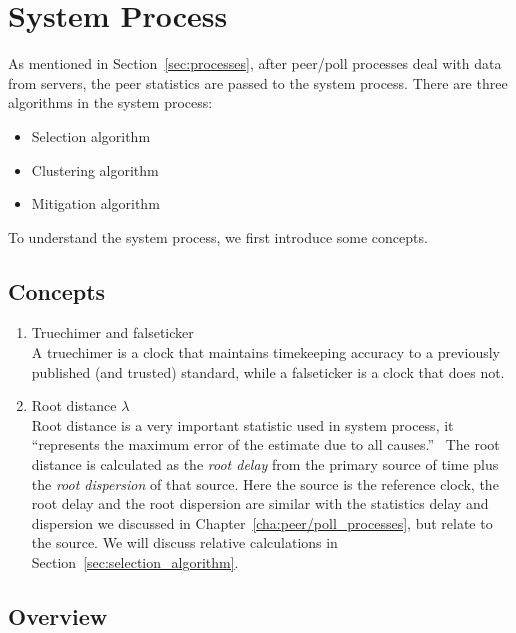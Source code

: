 

\chapter{System Process}
\label{cha:system_process}

As mentioned in Section~\ref{sec:processes}, after peer/poll processes deal
with data from servers, the peer statistics are passed to the system process.
There are three algorithms in the system process:
\begin{itemize}
    \item Selection algorithm
    \item Clustering algorithm
    \item Mitigation algorithm
\end{itemize}

To understand the system process, we first introduce some concepts.

\section{Concepts}%
\label{sec:system_concepts}
\begin{enumerate}
    \item Truechimer and falseticker\\
        A truechimer is a clock that maintains timekeeping accuracy to a
        previously published (and trusted) standard, while a falseticker is a
        clock that does not.
    \item Root distance $\lambda$\\
        Root distance is a very important statistic used in system process, it
        ``represents the maximum error of the estimate due to all
        causes.''~\cite{performance_metrics} The root distance is calculated as
        the \emph{root delay} from the primary source of time plus the
        \emph{root dispersion} of that source. Here the source is the reference
        clock, the root delay and the root dispersion are similar with the
        statistics delay and dispersion we discussed in
        Chapter~\ref{cha:peer/poll_processes}, but relate to the source. We
        will discuss relative calculations in
        Section~\ref{sec:selection_algorithm}.
\end{enumerate}

\section{Overview}%
\label{sec:system_overview}



